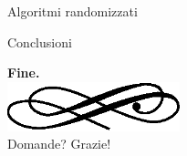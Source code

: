 	\begin{frame}{Algoritmi randomizzati}
	\end{frame}
	
	\begin{frame}{Conclusioni}
	\end{frame}
	
	\begin{frame}
		\begin{center}
			\textbf{\calligra\Huge Fine.}\\
			\includegraphics[width=5cm]{img/ornament.eps}\\[1cm]
			\pause
			{\huge\calligra Domande?\pause{} Grazie!}
		\end{center}
	\end{frame}

